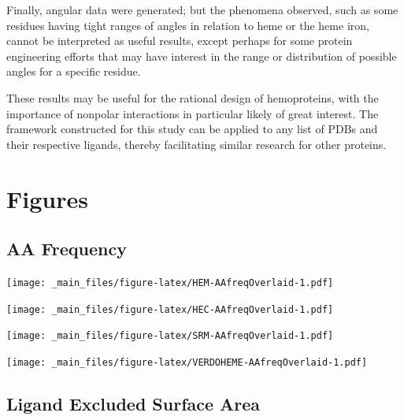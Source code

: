 \documentclass[a4paper, nobind]{templates/ociamthesis}
\let\origfigure\figure
\let\endorigfigure\endfigure
\renewenvironment{figure}[1][2] {
    \expandafter\origfigure\expandafter[H]
} {
    \endorigfigure
}
\begin{document}
Finally, angular data were generated; but the phenomena observed, such as some residues having tight ranges of angles in relation to heme or the heme iron, cannot be interpreted as useful results, except perhaps for some protein engineering efforts that may have interest in the range or distribution of possible angles for a specific residue.

These results may be useful for the rational design of hemoproteins, with the importance of nonpolar interactions in particular likely of great interest. The framework constructed for this study can be applied to any list of PDBs and their respective ligands, thereby facilitating similar research for other proteins.

\startappendices

\hypertarget{a-figures}{%
\chapter{Figures}\label{a-figures}}

\hypertarget{figs-aaFreqOverlaid}{%
\section{AA Frequency}\label{figs-aaFreqOverlaid}}

\begin{figure}
\centering
\texttt{[image: \_main\_files/figure-latex/HEM-AAfreqOverlaid-1.pdf]}
\caption{\label{fig:HEM-AAfreqOverlaid}HEM: AA Frequency}
\end{figure}

\begin{figure}
\centering
\texttt{[image: \_main\_files/figure-latex/HEC-AAfreqOverlaid-1.pdf]}
\caption{\label{fig:HEC-AAfreqOverlaid}HEC: AA Frequency}
\end{figure}

\begin{figure}
\centering
\texttt{[image: \_main\_files/figure-latex/SRM-AAfreqOverlaid-1.pdf]}
\caption{\label{fig:SRM-AAfreqOverlaid}SRM: AA Frequency}
\end{figure}

\begin{figure}
\centering
\texttt{[image: \_main\_files/figure-latex/VERDOHEME-AAfreqOverlaid-1.pdf]}
\caption{\label{fig:VERDOHEME-AAfreqOverlaid}VERDOHEME: AA Frequency}
\end{figure}

\hypertarget{figs-ligExcSA}{%
\section{Ligand Excluded Surface Area}\label{figs-ligExcSA}}
\end{document}
